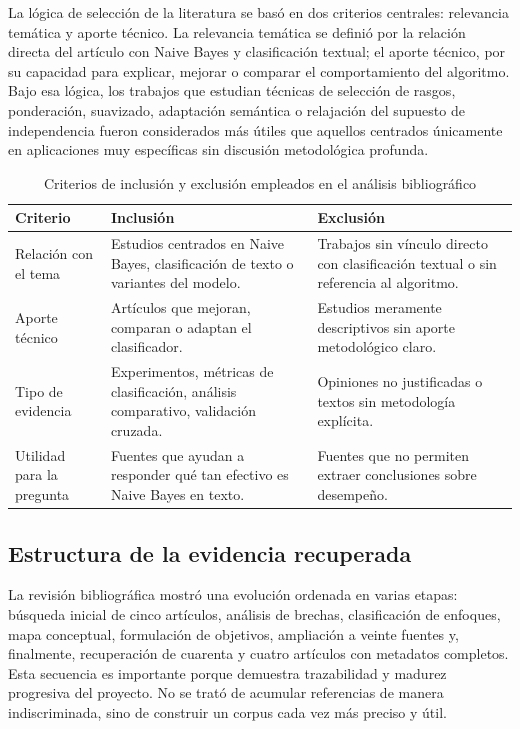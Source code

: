 La lógica de selección de la literatura se basó en dos criterios centrales: relevancia temática y aporte técnico. La relevancia temática se definió por la relación directa del artículo con Naive Bayes y clasificación textual; el aporte técnico, por su capacidad para explicar, mejorar o comparar el comportamiento del algoritmo. Bajo esa lógica, los trabajos que estudian técnicas de selección de rasgos, ponderación, suavizado, adaptación semántica o relajación del supuesto de independencia fueron considerados más útiles que aquellos centrados únicamente en aplicaciones muy específicas sin discusión metodológica profunda.

\begin{table}[htbp]
\centering
\caption{Criterios de inclusión y exclusión empleados en el análisis bibliográfico}
\label{tab:criterios}
\begin{tabular}{|p{3.2cm}|p{5.8cm}|p{5.5cm}|}
\hline
\textbf{Criterio} & \textbf{Inclusión} & \textbf{Exclusión} \\
\hline
Relación con el tema & Estudios centrados en Naive Bayes, clasificación de texto o variantes del modelo. & Trabajos sin vínculo directo con clasificación textual o sin referencia al algoritmo. \\
\hline
Aporte técnico & Artículos que mejoran, comparan o adaptan el clasificador. & Estudios meramente descriptivos sin aporte metodológico claro. \\
\hline
Tipo de evidencia & Experimentos, métricas de clasificación, análisis comparativo, validación cruzada. & Opiniones no justificadas o textos sin metodología explícita. \\
\hline
Utilidad para la pregunta & Fuentes que ayudan a responder qué tan efectivo es Naive Bayes en texto. & Fuentes que no permiten extraer conclusiones sobre desempeño. \\
\hline
\end{tabular}
\end{table}

\subsection{Estructura de la evidencia recuperada}

La revisión bibliográfica mostró una evolución ordenada en varias etapas: búsqueda inicial de cinco artículos, análisis de brechas, clasificación de enfoques, mapa conceptual, formulación de objetivos, ampliación a veinte fuentes y, finalmente, recuperación de cuarenta y cuatro artículos con metadatos completos. Esta secuencia es importante porque demuestra trazabilidad y madurez progresiva del proyecto. No se trató de acumular referencias de manera indiscriminada, sino de construir un corpus cada vez más preciso y útil.

